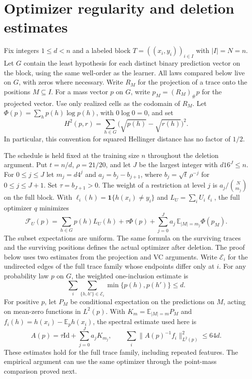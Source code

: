 \documentclass[11pt]{article}
\theoremstyle{definition}\newtheorem{definition}[theorem]{Definition}
\begin{document}
\section{Optimizer regularity and deletion estimates}
\label{app:deletion}

Fix integers $1\le d<n$ and a labeled block
$T=((x_i,y_i))_{i\in I}$ with $|I|=N=n$. Let $G$ contain the least
hypothesis for each distinct binary prediction vector on the block, using the
same well-order as the learner. All laws compared below live on $G$, with zeros
where necessary. Write $R_M$ for the projection of a trace onto the positions
$M\subseteq I$. For a mass vector $p$ on $G$, write $p_M=(R_M)_\#p$ for the
projected vector. Use only realized cells as the codomain of $R_M$. Let
$\Phi(p)=\sum_h p(h)\log p(h)$, with $0\log 0=0$, and set
\[
  H^2(p,r)=\sum_{h\in G}\bigl(\sqrt{p(h)}-\sqrt{r(h)}\bigr)^2.
\]
In particular, this convention for squared Hellinger distance has no factor of
$1/2$.

The schedule is held fixed at the training size $n$ throughout the deletion
argument. Put $t=n/d$, $\rho=21/20$, and let $J$ be the largest integer with
$d16^J\le n$. For $0\le j\le J$ let $m_j=d4^j$ and $a_j=b_j-b_{j+1}$, where
$b_j=\sqrt t\,\rho^{-j}$ for $0\le j\le J+1$. Set $\tau=b_{J+1}>0$. The weight
of a restriction at level $j$ is $a_j/\binom N{m_j}$ on the full block. With
$\ell_i(h)=\mathbf 1\{h(x_i)\ne y_i\}$ and $L_U=\sum_i U_i\ell_i$, the full
optimizer $q$ minimizes
\begin{equation}
  \mathcal F_U(p)=\sum_{h\in G}p(h)L_U(h)+\tau\Phi(p)
       +\sum_{j=0}^J a_j\,\mathbb E_{|M|=m_j}\Phi(p_M).
  \label{eq:deletion-objective}
\end{equation}
The subset expectations are uniform. The same formula on the surviving traces
and the surviving positions defines the actual optimizer after deletion. The
proof below uses two estimates from the projection and VC arguments. Write
$\mathcal E_i$ for the undirected edges of the full trace family whose endpoints
differ only at $i$. For any probability law $p$ on $G$, the weighted
one-inclusion estimate is
\begin{equation}
  \sum_i\sum_{\{h,h'\}\in\mathcal E_i}\min\{p(h),p(h')\}\le d.
  \label{eq:deletion-input-edges}
\end{equation}
For positive $p$, let $P_M$ be conditional expectation on the predictions on
$M$, acting on mean-zero functions in $L^2(p)$. With
$K_m=\mathbb E_{|M|=m}P_M$ and
$f_i(h)=h(x_i)-\mathbb E_p h(x_i)$, the spectral estimate used here is
\begin{equation}
  A(p)=\tau\mathrm{Id}+\sum_{j=0}^J a_jK_{m_j},
  \qquad
  \sum_i\|A(p)^{-1}f_i\|_{L^2(p)}^2\le 64d.
  \label{eq:deletion-input-spectrum}
\end{equation}
These estimates hold for the full trace family, including repeated features.
The empirical argument can use the same optimizer through the point-mass
comparison proved next.
\end{document}

